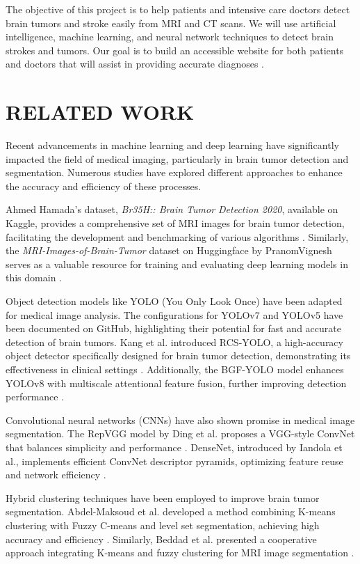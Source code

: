 \documentclass[conference]{IEEEtran}
\begin{document}
The objective of this project is to help patients and intensive care doctors detect brain tumors and stroke easily from MRI and CT scans.
We will use artificial intelligence, machine learning, and neural network techniques to detect brain strokes and tumors. 
Our goal is to build an accessible website for both patients and doctors that will assist in providing accurate diagnoses \cite{ma82, dattaad:10.1504}.

\section{ RELATED WORK}

Recent advancements in machine learning and deep learning have significantly impacted the field of medical imaging, particularly in brain tumor detection and segmentation.
Numerous studies have explored different approaches to enhance the accuracy and efficiency of these processes.

Ahmed Hamada's dataset, \emph{Br35H:: Brain Tumor Detection 2020}, available on Kaggle, 
provides a comprehensive set of MRI images for brain tumor detection, facilitating the development and benchmarking of various algorithms \cite{br35h}.
Similarly, the \emph{MRI-Images-of-Brain-Tumor} dataset on Huggingface by PranomVignesh serves as a valuable resource for training and evaluating deep learning models in this domain \cite{huggingface_data}.

Object detection models like YOLO (You Only Look Once) have been adapted for medical image analysis.
The configurations for YOLOv7 \cite{wong2020yolo7} and YOLOv5 \cite{jocher2022yolo5} have been documented on GitHub, 
highlighting their potential for fast and accurate detection of brain tumors.
Kang et al. introduced RCS-YOLO, a high-accuracy object detector specifically designed for brain tumor detection, demonstrating its effectiveness in clinical settings \cite{Kang2023}.
Additionally, the BGF-YOLO model enhances YOLOv8 with multiscale attentional feature fusion, further improving detection performance \cite{kang2023bgfyolo}.

Convolutional neural networks (CNNs) have also shown promise in medical image segmentation. 
The RepVGG model by Ding et al. proposes a VGG-style ConvNet that balances simplicity and performance \cite{ding2021repvgg}.
DenseNet, introduced by Iandola et al., implements efficient ConvNet descriptor pyramids, optimizing feature reuse and network efficiency \cite{iandola2014densenet}.

Hybrid clustering techniques have been employed to improve brain tumor segmentation. 
Abdel-Maksoud et al. developed a method combining K-means clustering with Fuzzy C-means and level set segmentation, achieving high accuracy and efficiency \cite{ABDELMAKSOUD201571-51}.
Similarly, Beddad et al. presented a cooperative approach integrating K-means and fuzzy clustering for MRI image segmentation \cite{dattaad:10.1504}.
\end{document}
